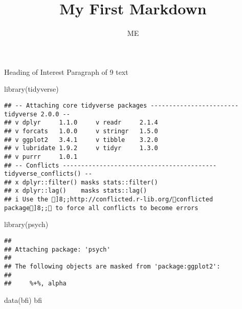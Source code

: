 \documentclass[
  ignorenonframetext,
]{beamer}
\title{My First Markdown}
\author{ME}
\date{}
\newenvironment{Shaded}{\begin{snugshade}}{\end{snugshade}}
\newcommand{\FunctionTok}[1]{\textcolor[rgb]{0.00,0.00,0.00}{#1}}
\newcommand{\NormalTok}[1]{#1}
\begin{document}
\frame{\titlepage}

\begin{frame}[fragile]{Heading of Interest}
\protect\hypertarget{heading-of-interest}{}
Paragraph of 9 text

\begin{Shaded}
\begin{Highlighting}[]
\FunctionTok{library}\NormalTok{(tidyverse)}
\end{Highlighting}
\end{Shaded}

\begin{verbatim}
## -- Attaching core tidyverse packages ------------------------ tidyverse 2.0.0 --
## v dplyr     1.1.0     v readr     2.1.4
## v forcats   1.0.0     v stringr   1.5.0
## v ggplot2   3.4.1     v tibble    3.2.0
## v lubridate 1.9.2     v tidyr     1.3.0
## v purrr     1.0.1     
## -- Conflicts ------------------------------------------ tidyverse_conflicts() --
## x dplyr::filter() masks stats::filter()
## x dplyr::lag()    masks stats::lag()
## i Use the ]8;;http://conflicted.r-lib.org/conflicted package]8;; to force all conflicts to become errors
\end{verbatim}

\begin{Shaded}
\begin{Highlighting}[]
\FunctionTok{library}\NormalTok{(psych)}
\end{Highlighting}
\end{Shaded}

\begin{verbatim}
## 
## Attaching package: 'psych'
## 
## The following objects are masked from 'package:ggplot2':
## 
##     %+%, alpha
\end{verbatim}

\begin{Shaded}
\begin{Highlighting}[]
\FunctionTok{data}\NormalTok{(bfi)}
\NormalTok{bfi}
\end{Highlighting}
\end{Shaded}


\end{frame}
\end{document}
